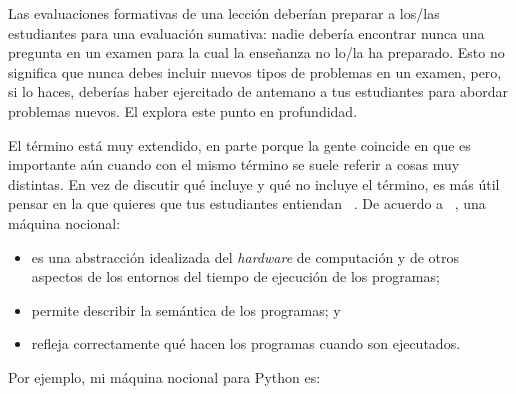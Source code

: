 Las evaluaciones formativas de una lección deberían preparar a los/las estudiantes para una evaluación sumativa:
nadie debería encontrar nunca una pregunta en un examen para la cual la enseñanza no lo/la ha preparado.
Esto no significa que nunca debes incluir nuevos tipos de problemas en un examen, pero, si lo haces,
deberías haber ejercitado de antemano a tus estudiantes para abordar problemas nuevos. 
El  explora este punto en profundidad.


El término  está muy extendido,
en parte porque la gente coincide en que es importante aún cuando con el mismo término se suele referir a cosas muy distintas.
En vez de discutir qué incluye y qué no incluye el término,
es más útil pensar en la 
que quieres que tus estudiantes entiendan ~\cite{DuBo1986}.
De acuerdo a ~\cite{Sorv2013},
una máquina nocional:

\begin{itemize}

\item
es una abstracción idealizada del \emph{hardware} de computación  
y de otros aspectos de los entornos del tiempo de ejecución de los programas;

\item
  permite describir la semántica de los programas;
  y

\item
  refleja correctamente qué hacen los programas cuando son ejecutados.

\end{itemize}

\noindent
Por ejemplo, mi máquina nocional para Python es:


